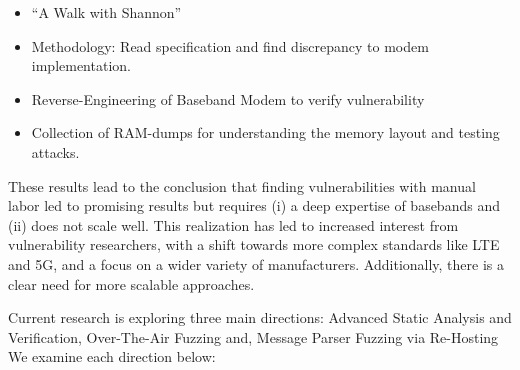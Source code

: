 \documentclass[a4paper,11pt,oneside]{report}
\begin{document}
\begin{itemize}
  \item \enquote{A Walk with Shannon}~\cite{Cama18}
  \item Methodology: Read specification and find discrepancy to modem implementation.
  \item Reverse-Engineering of Baseband Modem to verify vulnerability
  \item Collection of RAM-dumps for understanding the memory layout and testing attacks.
\end{itemize}

These results lead to the conclusion that finding vulnerabilities with manual labor led to promising results but requires (i) a deep expertise of basebands and (ii) does not scale well.
This realization has led to increased interest from vulnerability researchers, with a shift towards more complex standards like LTE and 5G, and a focus on a wider variety of manufacturers. 
Additionally, there is a clear need for more scalable approaches.

Current research is exploring three main directions: 
Advanced Static Analysis and Verification, Over-The-Air Fuzzing and, Message Parser Fuzzing via Re-Hosting
We examine each direction below:
\end{document}
